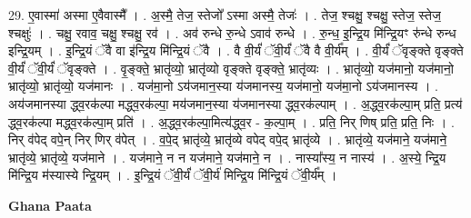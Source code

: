 \documentclass[17pt]{extarticle}
\begin{document}
29. ए॒वास्मा॑ अस्मा ए॒वैवास्मै᳚ । . अ॒स्मै॒ तेज॒ स्तेजो᳚ ऽस्मा अस्मै॒ तेजः॑ । . तेज॒ श्चक्षु॒ श्चक्षु॒ स्तेज॒ स्तेज॒ श्चक्षुः॑ । . चक्षु॒ रवाव॒ चक्षु॒ श्चक्षु॒ रव॑ । . अव॑ रुन्धे रु॒न्धे ऽवाव॑ रुन्धे । . रु॒न्ध॒ इ॒न्द्रि॒य मि॑न्द्रि॒यꣳ रु॑न्धे रुन्ध इन्द्रि॒यम् । . इ॒न्द्रि॒यं ॅवै वा इ॑न्द्रि॒य मि॑न्द्रि॒यं ॅवै । . वै वी॒र्यं॑ ॅवी॒र्यं॑ ॅवै वै वी॒र्य᳚म् । . वी॒र्यं॑ ॅवृङ्क्ते वृङ्क्ते वी॒र्यं॑ ॅवी॒र्यं॑ ॅवृङ्क्ते । . वृ॒ङ्क्ते॒ भ्रातृ॑व्यो॒ भ्रातृ॑व्यो वृङ्क्ते वृङ्क्ते॒ भ्रातृ॑व्यः । . भ्रातृ॑व्यो॒ यज॑मानो॒ यज॑मानो॒ भ्रातृ॑व्यो॒ भ्रातृ॑व्यो॒ यज॑मानः । . यज॑मा॒नो ऽय॑जमान॒स्या य॑जमानस्य॒ यज॑मानो॒ यज॑मा॒नो ऽय॑जमानस्य । . अय॑जमानस्या द्ध्व॒रक॑ल्पा मद्ध्व॒रक॑ल्पा॒ मय॑जमान॒स्या य॑जमानस्या द्ध्व॒रक॑ल्पाम् । . अ॒द्ध्व॒रक॑ल्पा॒म् प्रति॒ प्रत्य॑ द्ध्व॒रक॑ल्पा मद्ध्व॒रक॑ल्पा॒म् प्रति॑ । . अ॒द्ध्व॒रक॑ल्पा॒मित्य॑द्ध्व॒र - क॒ल्पा॒म् । . प्रति॒ निर् णिष् प्रति॒ प्रति॒ निः । . निर् व॑पेद् वपे॒न् निर् णिर् व॑पेत् । . व॒पे॒द् भ्रातृ॑व्ये॒ भ्रातृ॑व्ये वपेद् वपे॒द् भ्रातृ॑व्ये । . भ्रातृ॑व्ये॒ यज॑माने॒ यज॑माने॒ भ्रातृ॑व्ये॒ भ्रातृ॑व्ये॒ यज॑माने । . यज॑माने॒ न न यज॑माने॒ यज॑माने॒ न । . नास्या᳚स्य॒ न नास्य॑ । . अ॒स्ये॒ न्द्रि॒य मि॑न्द्रि॒य म॑स्यास्ये न्द्रि॒यम् । . इ॒न्द्रि॒यं ॅवी॒र्यं॑ ॅवी॒र्य॑ मिन्द्रि॒य मि॑न्द्रि॒यं ॅवी॒र्य᳚म् । \newline

\textbf{Ghana Paata } \newline
\end{document}

